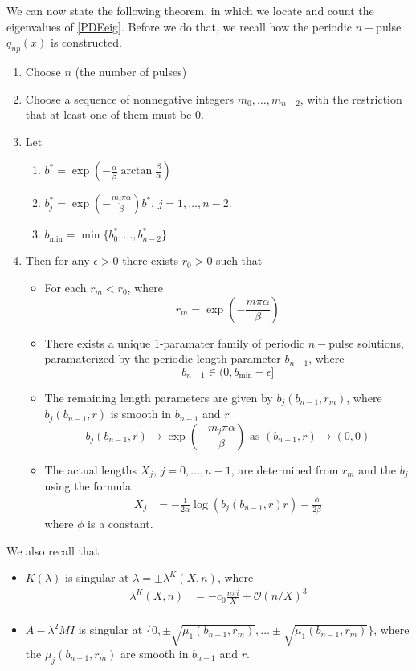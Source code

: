 \documentclass[12pt]{article}
\begin{document}
We can now state the following theorem, in which we locate and count the eigenvalues of \eqref{PDEeig}. Before we do that, we recall how the periodic $n-$pulse $q_{np}(x)$ is constructed.

\begin{enumerate}
	\item Choose $n$ (the number of pulses) 
	\item Choose a sequence of nonnegative integers $m_0, \dots, m_{n-2}$, with the restriction that at least one of them must be 0. 
	\item Let
		\begin{enumerate}
			\item $b^* = \exp \left( -\frac{\alpha}{\beta} \arctan \frac{\beta}{\alpha} \right)$
			\item $b_j^* = \exp \left(-\frac{m_j \pi \alpha}{\beta} \right) b^*$, $j = 1, \dots, n-2$.
			\item $b_\text{min} = \min\{ b_0^*, \dots, b_{n-2}^* \}$
		\end{enumerate}
	\item Then for any $\epsilon > 0$ there exists $r_0 > 0$ such that
		\begin{itemize}
			\item For each $r_m < r_0$, where 
				\[ r_m = \exp\left(-\frac{m \pi \alpha}{\beta} \right)  \]
			\item There exists a unique 1-paramater family of periodic $n-$pulse solutions, paramaterized by the periodic length parameter $b_{n-1}$, where
			     \[ b_{n-1} \in (0, b_\text{min} - \epsilon] \]
			\item The remaining length parameters are given by $b_j(b_{n-1}, r_m)$, where $b_j(b_{n-1}, r)$ is smooth in $b_{n-1}$ and $r$
				\[ b_j(b_{n-1}, r) \rightarrow \exp \left(-\frac{m_j \pi \alpha}{\beta} \right) \text{ as } (b_{n-1}, r) \rightarrow (0,0) \]
			\item The actual lengths $X_j$, $j = 0, \dots, n-1$, are determined from $r_m$ and the $b_j$ using the formula
			\begin{align*}
				X_j &= -\frac{1}{2\alpha}\log(b_j(b_{n-1}, r) r) - \frac{\phi}{2 \beta} 
			\end{align*}
			where $\phi$ is a constant.
		\end{itemize}
\end{enumerate}

We also recall that

\begin{itemize}
	\item $K(\lambda)$ is singular at $\lambda = \pm \lambda^K(X,n)$, where
	\begin{align*}
		\lambda^K(X,n) &= -c_0 \frac{n \pi i }{X} + \mathcal{O}(n/X)^3 \\
	\end{align*}
	\item $A - \lambda^2 M I$ is singular at $\{ 0, \pm \sqrt{\mu_1(b_{n-1}, r_m)}, \dots \pm \sqrt{\mu_1(b_{n-1}, r_m)} \}$, where the $\mu_j(b_{n-1}, r_m)$ are smooth in $b_{n-1}$ and $r$.
\end{itemize}
\end{document}
